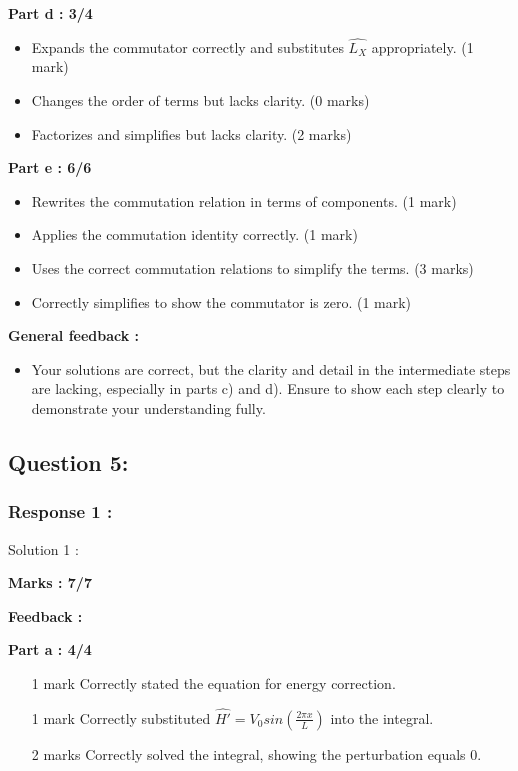\documentclass[a4paper,11pt]{article}
\begin{document}
\textbf{Part d : 3/4}

\begin{itemize}
    \item Expands the commutator correctly and substitutes $\hat{L_X}$ appropriately. (1 mark)
    \item Changes the order of terms but lacks clarity. (0 marks)
    \item Factorizes and simplifies but lacks clarity. (2 marks)
\end{itemize}



\textbf{Part e : 6/6}

\begin{itemize}
    \item Rewrites the commutation relation in terms of components. (1 mark)
    \item Applies the commutation identity correctly. (1 mark)
    \item Uses the correct commutation relations to simplify the terms. (3 marks)
    \item Correctly simplifies to show the commutator is zero. (1 mark)
\end{itemize}


\textbf{General feedback :}

\begin{itemize}
    \item Your solutions are correct, but the clarity and detail in the intermediate steps are lacking, especially in parts c) and d). Ensure to show each step clearly to demonstrate your understanding fully.
\end{itemize}



\subsection*{Question 5:}

\subsubsection*{Response 1 :}

Solution 1 :

\textbf{Marks : 7/7}

\textbf{Feedback :}

\textbf{Part a : 4/4}

\begin{itemize}
    \item [1 mark] Correctly stated the equation for energy correction.
    \item [1 mark] Correctly substituted $\hat{H'} = V_{0}sin(\frac{2\pi x}{L})$ into the integral.
    \item [2 marks] Correctly solved the integral, showing the perturbation equals 0.
\end{itemize}
\end{document}
